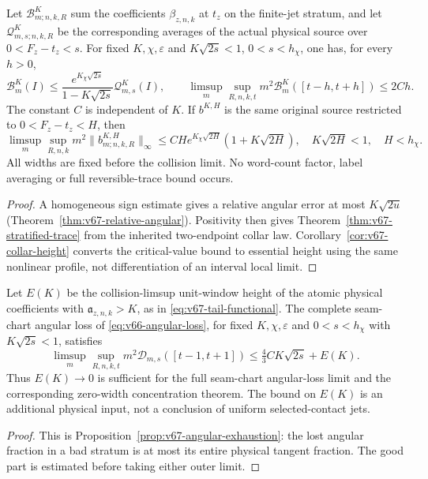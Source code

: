 \begin{leadtheorem}
\label{thm:intro-v67-trace}
Let $\mathcal B^K_{m;n,k,R}$ sum the coefficients $\beta_{z,n,k}$
at $t_z$ on the finite-jet stratum, and let
$\mathcal Q^K_{m,s;n,k,R}$ be the corresponding averages of the actual
physical source over $0<F_z-t_z<s$. For fixed $K,\chi,\varepsilon$
and $K\sqrt{2s}<1$, $0<s<h_\chi$, one has, for every $h>0$,
\[
 \mathcal B^K_m(I)\le
       \frac{e^{K_\chi\sqrt{2s}}}{1-K\sqrt{2s}}\mathcal Q^K_{m,s}(I),
 \qquad
 \limsup_m\sup_{R,n,k,t}m^2\mathcal B^K_m([t-h,t+h])\le2Ch.
\]
The constant $C$ is independent of $K$. If $b^{K,H}$ is the same
original source restricted to $0<F_z-t_z<H$, then
\[
 \limsup_m\sup_{R,n,k}m^2\|b^{K,H}_{m;n,k,R}\|_\infty
 \le CH e^{K_\chi\sqrt{2H}}(1+K\sqrt{2H}),
 \quad K\sqrt{2H}<1,\quad H<h_\chi.
\]
All widths are fixed before the collision limit. No word-count factor,
label averaging or full reversible-trace bound occurs.
\end{leadtheorem}
\begin{proof}
A homogeneous sign estimate gives a relative angular error at most
$K\sqrt{2u}$ (Theorem~\ref{thm:v67-relative-angular}). Positivity
then gives Theorem~\ref{thm:v67-stratified-trace} from the inherited
two-endpoint collar law. Corollary~\ref{cor:v67-collar-height}
converts the critical-value bound to essential height using the same
nonlinear profile, not differentiation of an interval local limit.
\end{proof}

\begin{leadtheorem}
\label{thm:intro-v67-tail}
Let $E(K)$ be the collision-limsup unit-window height of the atomic
physical coefficients with $\mathfrak a_{z,n,k}>K$, as in
\eqref{eq:v67-tail-functional}. The complete seam-chart angular loss
of \eqref{eq:v66-angular-loss}, for fixed $K,\chi,\varepsilon$ and
$0<s<h_\chi$ with $K\sqrt{2s}<1$, satisfies
\[
 \limsup_m\sup_{R,n,k,t}m^2\mathcal D_{m,s}([t-1,t+1])
                           \le\tfrac43 CK\sqrt{2s}+E(K).
\]
Thus $E(K)\to0$ is sufficient for the full seam-chart angular-loss
limit and the corresponding zero-width concentration theorem.
The bound on $E(K)$ is an additional physical input, not a conclusion
of uniform selected-contact jets.
\end{leadtheorem}
\begin{proof}
This is Proposition~\ref{prop:v67-angular-exhaustion}: the lost angular
fraction in a bad stratum is at most its entire physical tangent
fraction. The good part is estimated before taking either outer limit.
\end{proof}


